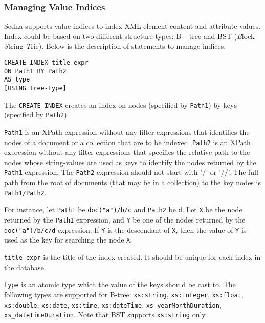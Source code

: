 \documentclass[a4paper,12pt]{article}
\begin{document}
\subsubsection{Managing Value Indices}
\label{sec:managing-value-indices}

Sedna supports value indices to index XML element content and attribute values.
Index could be based on two different structure types: B+ tree and BST
(\emph{B}lock \emph{S}tring \emph{T}rie). Below is the description of
statements to manage indices.

\begin{verbatim}
CREATE INDEX title-expr
ON Path1 BY Path2
AS type
[USING tree-type]
\end{verbatim}

The \verb!CREATE INDEX! creates an index on nodes (specified by \verb!Path1!) by
keys (specified by \verb!Path2!).

\verb!Path1! is an XPath expression without any filter expressions that
identifies the nodes of a document or a collection that are to be indexed.
\verb!Path2! is an XPath expression without any filter expressions that
specifies the relative path to the nodes whose string-values are used as keys to
identify the nodes returned by the \verb!Path1! expression. The \verb!Path2!
expression should not start with '/' or '//'. The full path from the root of
documents (that may be in a collection) to the key nodes is \verb!Path1/Path2!.

For instance, let \verb!Path1! be \verb!doc("a")/b/c! and \verb!Path2! be
\verb!d!. Let \verb!X! be the node returned by the \verb!Path1! expression, and
\verb!Y! be one of the nodes returned by the \verb!doc("a")/b/c/d! expression.
If \verb!Y! is the descendant of \verb!X!, then the value of \verb!Y! is used as
the key for searching the node \verb!X!.

\verb!title-expr! is the title of the index created. It should be unique for
each index in the database.

\verb!type! is an atomic type which the value of the keys should be cast to. The
following types are supported for B-tree: \verb!xs:string!, \verb!xs:integer!,
\verb!xs:float!, \verb!xs:double!, \verb!xs:date!, \verb!xs:time!,
\verb!xs:dateTime!, \verb!xs_yearMonthDuration!, \verb!xs_dateTimeDuration!. Note
that BST supports \verb!xs:string! only.
\end{document}
